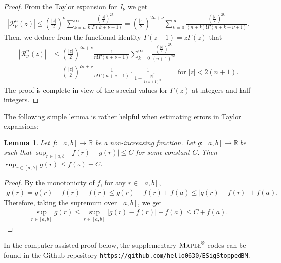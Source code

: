 \documentclass[11pt,a4paper,english,reqno]{amsart}
\theoremstyle{plain}
\newtheorem{lemma}[definition]{Lemma}
\newcommand{\G}{\Gamma}
\newcommand{\1}{\mathbbm{1}}
\begin{document}
\begin{proof} 
From the Taylor expansion for $J_\nu$ we get
\begin{align*}
\left|\mathscr{R}_\nu^n(z)\right| \leq \left(\frac{|z|}{2}\right)^\nu \sum_{k=n}^\infty \frac{\left(\frac{|z|}{2}\right)^{2k}}{k!\G(k+\nu+1)}= \left(\frac{|z|}{2}\right)^{2n+\nu} \sum_{k=0}^\infty \frac{\left(\frac{|z|}{2}\right)^{2k}}{(n+k)!\G(n+k+\nu+1)}.
\end{align*}
Then, we deduce from the functional identity $\G(z+1)=z\G(z)$ that
\begin{align*}
\left|\mathscr{R}_\nu^n(z)\right| &\leq \left(\frac{|z|}{2}\right)^{2n+\nu}\frac{1}{n! \G(n+\nu+1)} \sum_{k=0}^\infty\frac{\left(\frac{|z|}{2}\right)^{2k}}{(n+1)^{2k}}\\
&= \left(\frac{|z|}{2}\right)^{2n+\nu}\frac{1}{n! \G(n+\nu+1)} \cdot \frac{1}{1-\frac{|z|^2}{4(n+1)^2}}\qquad\text{ for } |z|<2(n+1).
\end{align*}
The proof is complete in view of the special values for $\G(z)$ at integers and half-integers.  \end{proof}


The following simple lemma is rather helpful when estimating errors in Taylor expansions: 
\begin{lemma}\label{Lemma: bound_estimator}
Let $f: [a, b] \rightarrow \mathbb{R}$ be a non-increasing function. Let $g: [a, b] \rightarrow \mathbb{R}$ be  such that $\sup_{r \in [a, b]} |f(r) - g(r)| \leq C$ for some constant $C$. Then $\sup_{r \in [a, b]} g(r) \leq f(a) + C$. 
\end{lemma}
\begin{proof}
By the monotonicity of $f$, for any $r \in [a, b]$,
\begin{eqnarray*}
g(r) = g(r) - f(r) + f(r) \leq g(r)-f(r)+f(a) \leq |g(r) - f(r)| + f(a).
\end{eqnarray*}
Therefore, taking the supremum over $[a,b]$, we get
\begin{eqnarray*}
\sup_{r \in [a, b]} g(r) \leq \sup_{r \in [a, b]} |g(r) - f(r)| + f(a) \leq C + f(a).
\end{eqnarray*}
\end{proof}

In the computer-assisted proof below, the supplementary $\textsc{Maple}^\text{\textregistered}$ codes can be found in the Github repository \texttt{https://github.com/hello0630/ESigStoppedBM}.
\end{document}
